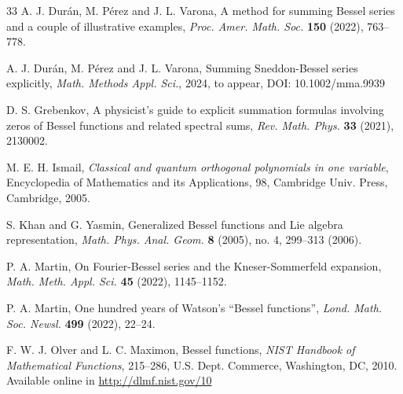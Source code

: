 \documentclass[12pt,leqno]{amsart}
\numberwithin{equation}{section}
\theoremstyle{plain}
\begin{document}
\begin{thebibliography}{33}
A. J. Dur\'an, M. P\'erez and J. L. Varona,
{A method for summing Bessel series and a couple of illustrative examples},
\textit{Proc. Amer. Math. Soc.}
\textbf{150} (2022), 763--778.

A. J. Dur\'an, M. P\'erez and J. L. Varona,
{Summing Sneddon-Bessel series explicitly},
\textit{Math. Methods Appl. Sci.}, 2024, to appear,
DOI: 10.1002/mma.9939

D. S. Grebenkov,
A physicist's guide to explicit summation formulas involving zeros of Bessel functions and related spectral sums,
\textit{Rev. Math. Phys.} \textbf{33} (2021), 2130002.

M. E. H. Ismail,
\textit{Classical and quantum orthogonal polynomials in one variable},
Encyclopedia of Mathematics and its Applications, 98,
Cambridge Univ. Press,
Cambridge, 2005.

S. Khan and G. Yasmin, 
Generalized Bessel functions and Lie algebra representation,
\textit{Math. Phys. Anal. Geom.} \textbf{8} (2005), no. 4, 299--313 (2006).

P. A. Martin,
On Fourier-Bessel series and the Kneser-Sommerfeld expansion,
\textit{Math. Meth. Appl. Sci.}
\textbf{45} (2022), 1145--1152.

P. A. Martin,
One hundred years of Watson's ``Bessel functions'',
\textit{Lond. Math. Soc. Newsl.} \textbf{499} (2022), 22--24.

F. W. J. Olver and L. C. Maximon,
Bessel functions,
\textit{NIST Handbook of Mathematical Functions},
215--286, %
U.S. Dept. Commerce, Washington, DC, 2010.
Available online in \url{http://dlmf.nist.gov/10}



\end{thebibliography}
\end{document}
